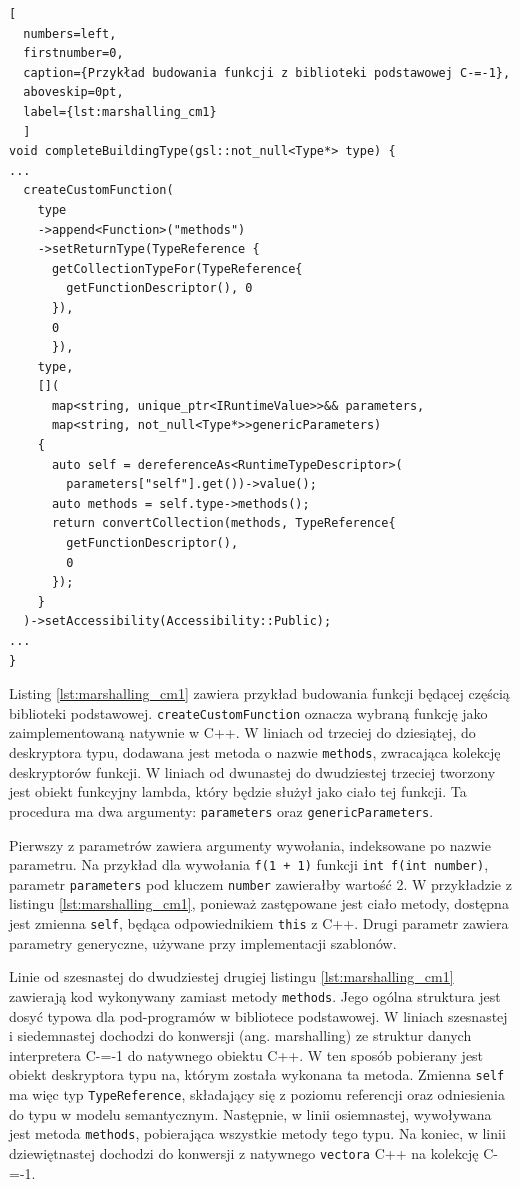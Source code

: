 \begin{minipage}{\linewidth}
\begin{lstlisting}[
  numbers=left,
  firstnumber=0,
  caption={Przykład budowania funkcji z biblioteki podstawowej C-=-1},
  aboveskip=0pt,
  label={lst:marshalling_cm1}
  ]
void completeBuildingType(gsl::not_null<Type*> type) {
...
  createCustomFunction(
    type
    ->append<Function>("methods")
    ->setReturnType(TypeReference {
      getCollectionTypeFor(TypeReference{
        getFunctionDescriptor(), 0 
      }),
      0 
      }),
    type,
    [](
      map<string, unique_ptr<IRuntimeValue>>&& parameters,
      map<string, not_null<Type*>>genericParameters)
    {
      auto self = dereferenceAs<RuntimeTypeDescriptor>(
        parameters["self"].get())->value();
      auto methods = self.type->methods();
      return convertCollection(methods, TypeReference{
        getFunctionDescriptor(),
        0
      });
    }
  )->setAccessibility(Accessibility::Public);
...
}
\end{lstlisting}
\end{minipage}

Listing \ref{lst:marshalling_cm1} zawiera przykład budowania funkcji będącej częścią biblioteki podstawowej.
\lstinline{createCustomFunction} oznacza wybraną  funkcję jako zaimplementowaną natywnie w C++.
W liniach od trzeciej do dziesiątej, do deskryptora typu, dodawana jest metoda o nazwie \lstinline{methods}, zwracająca kolekcję deskryptorów funkcji.
W liniach od dwunastej do dwudziestej trzeciej tworzony jest obiekt funkcyjny lambda, który będzie służył jako ciało tej funkcji.
Ta procedura ma dwa argumenty: \lstinline{parameters} oraz \lstinline{genericParameters}.

Pierwszy z parametrów zawiera argumenty wywołania, indeksowane po nazwie parametru.
Na przykład dla wywołania \lstinline{f(1 + 1)} funkcji \lstinline{int f(int number)}, parametr \lstinline{parameters} pod kluczem \lstinline{number} zawierałby wartość 2.
W przykładzie z listingu \ref{lst:marshalling_cm1}, ponieważ zastępowane jest ciało metody, dostępna jest zmienna \lstinline{self}, będąca odpowiednikiem \lstinline{this} z C++.
Drugi parametr zawiera parametry generyczne, używane przy implementacji szablonów.

Linie od szesnastej do dwudziestej drugiej listingu \ref{lst:marshalling_cm1} zawierają kod wykonywany zamiast metody \lstinline{methods}.
Jego ogólna struktura jest dosyć typowa dla pod-programów w bibliotece podstawowej.
W liniach szesnastej i siedemnastej dochodzi do konwersji (ang. marshalling)\cite{wiki:Marshalling} ze struktur danych interpretera C-=-1 do natywnego obiektu C++.
W ten sposób pobierany jest obiekt deskryptora typu na, którym została wykonana ta metoda.
Zmienna \lstinline{self} ma więc typ \lstinline{TypeReference}, składający się z poziomu referencji oraz odniesienia do typu w modelu semantycznym.
Następnie, w linii osiemnastej, wywoływana jest metoda \lstinline{methods}, pobierająca wszystkie metody tego typu.
Na koniec, w linii dziewiętnastej dochodzi do konwersji z natywnego \lstinline{vectora} C++ na kolekcję C-=-1.


